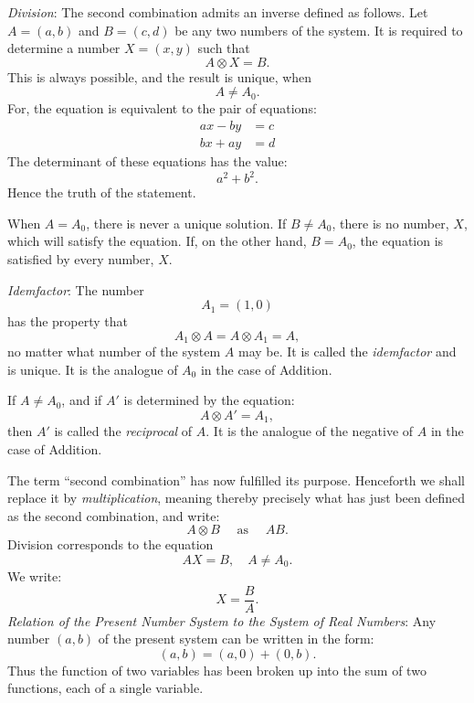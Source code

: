 \emph{Division}: The second combination admits an inverse defined as follows. Let $A=(a,b)$ and $B=(c,d)$ be any two numbers of the system. It is required to determine a number $X=(x,y)$ such that
\[
A\otimes X=B
.\] This is always possible, and the result is unique, when
\[
A\neq A_0
.\] For, the equation is equivalent to the pair of equations:
\begin{align*}
	ax-by&=c\\
	bx+ay&=d
\end{align*} The determinant of these equations has the value:
\[
a^2+b^2
.\] Hence the truth of the statement.

When $A=A_0$, there is never a unique solution. If $B\neq A_0$, there is no number, $X$, which will satisfy the equation. If, on the other hand, $B=A_0$, the equation is satisfied by every number, $X$. 

\emph{Idemfactor}: The number
\[
	A_1=(1,0)
\] has the property that
\[
A_1\otimes A=A\otimes A_1=A
,\] no matter what number of the system $A$ may be. It is called the \emph{idemfactor} and is unique. It is the analogue of $A_0$ in the case of Addition. 

If $A\neq A_0$, and if $A'$ is determined by the equation:
\[
A\otimes A'=A_1
,\] then $A'$ is called the \emph{reciprocal} of $A$. It is the analogue of the negative of $A$ in the case of Addition.

The term ``second combination'' has now fulfilled its purpose. Henceforth we shall replace it by \emph{multiplication}, meaning thereby precisely what has just been defined as the second combination, and write:
\[
A\otimes B \quad \text{ as } \quad AB
.\] Division corresponds to the equation 
\[
AX=B, \quad A\neq A_0
.\] We write:
\[
X=\frac{B}{A}
.\] \emph{Relation of the Present Number System to the System of Real Numbers}: Any number $(a,b)$ of the present system can be written in the form:
\[
	(a,b)=(a,0)+(0,b)
.\] Thus the function of two variables has been broken up into the sum of two functions, each of a single variable. 

